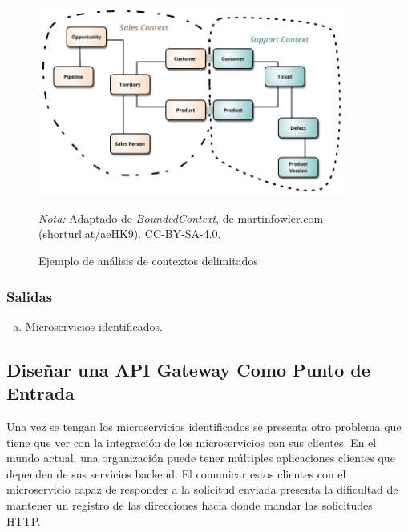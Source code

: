 \vspace{1em}
\begin{figure}[H]
  \caption{Ejemplo de análisis de contextos delimitados}
  \begin{center}
    \includegraphics[width=0.90\textwidth]{src/assets/metodologia/bounded_context}
    \label{fig:bounded_context_example}
  \end{center}
  \textit{Nota:} Adaptado de \textit{BoundedContext}, de \cite{bounded} martinfowler.com (shorturl.at/aeHK9). CC-BY-SA-4.0.
\end{figure}

\subsubsection*{Salidas}
\begin{enumerate}[a.]
  \item Microservicios identificados.
\end{enumerate}


\subsection{Diseñar una API Gateway Como Punto de Entrada}
Una vez se tengan los microservicios identificados se presenta otro problema que tiene que ver con
la integración de los microservicios con sus clientes.
En el mundo actual, una organización puede tener múltiples aplicaciones clientes que dependen
de sus servicios backend. 
El comunicar estos clientes con el microservicio capaz de responder a la solicitud enviada
presenta la dificultad de mantener un registro de las direcciones hacia donde mandar las
solicitudes HTTP.

